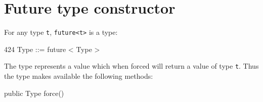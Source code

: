 \section{Future type constructor}
For any type {\tt t}, {\tt future<t>} is a type:
\begin{x10}
424   Type ::=   future < Type >  
\end{x10}
The type  represents a value which when forced will return a value of type
{\tt t}. Thus the type makes available the following methods:

\begin{x10}
  public Type force() {}
\end{x10}

